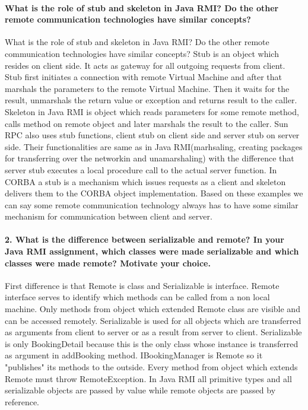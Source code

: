 \documentclass{ds-report}
\begin{document}
	\maketitle

	\paragraph{What is the role of stub and skeleton in Java RMI? Do the other remote communication technologies	have similar concepts? \newline}
	What is the role of stub and skeleton in Java RMI? Do the other remote communication technologies have similar concepts?
	Stub is an object which resides on client side. It acts as gateway for all outgoing requests from client. Stub first initiates a connection with 
	remote Virtual Machine and after that marshals the parameters to the remote Virtual Machine. Then it waits for the result, unmarshals the return
	value or exception and returns result to the caller. Skeleton in Java RMI is object which reads parameters for some remote method, calls method on
	remote object and later marshals the result to the caller. Sun RPC also uses stub functions, client stub on client side and server stub on server side.
	Their functionalities are same as in Java RMI(marhsaling, creating packages for transferring over the networkin and unamarshaling) with the difference that server stub executes a local procedure call to the actual server function.
	In CORBA a stub is a mechanism which issues requests as a client and skeleton delivers them to the CORBA object implementation. Based on these examples
	we can say some remote communication technology always has to have some similar mechanism for communication between client and server.
	
	
	
	\paragraph{2. What is the difference between serializable and remote? In your Java RMI assignment, which classes were made serializable and which classes were made remote? Motivate your choice. \newline}
	First difference is that Remote is class and Serializable is interface. Remote interface serves to identify which methods can be called from a non
	local machine. Only methods from object which extended Remote class are visible and can be accessed remotely. Serializable is used for all objects
	which are transferred as arguments from client to server or as a result from server to client. Serializable is only BookingDetail because this is 
	the only class whose instance is transferred as argument in addBooking method. IBookingManager is Remote so it "publishes" its methods to the outside.
	Every method from object which extends Remote must throw RemoteException. In Java RMI all primitive types and all serializable objects are passed
	by value while remote objects are passed by reference.
	
\end{document}
